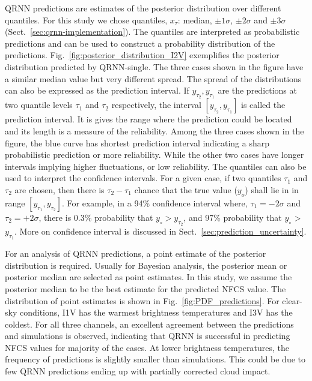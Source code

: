 \documentclass[amt, manuscript]{copernicus}
\begin{document}
QRNN predictions are estimates of the posterior distribution over different quantiles. For this study we chose quantiles, $x_{\tau}$: median, $\pm 1\sigma$, $\pm 2 \sigma$ and  $\pm 3 \sigma$ (Sect.~\ref{sec:qrnn-implementation}). The quantiles are interpreted as probabilistic predictions and can be used to construct a probability distribution of the predictions. Fig.~\ref{fig:posterior_distribution_I2V} exemplifies the posterior distribution predicted by QRNN-single. The three cases shown in the figure have a similar median value but very different spread. The spread of the distributions can also be expressed as the prediction interval. If $y_{\tau_2}, y_{\tau_1}$ are the predictions at two quantile levels $\tau_1$ and $\tau_2$ respectively, the interval $[y_{\tau_2}, y_{\tau_1}]$ is called the prediction interval. It is gives the range where the prediction could be located and its length is a measure of the reliability. Among the three cases shown in the figure, the blue curve has shortest prediction interval indicating a sharp probabilistic prediction or more reliability. While the other two cases have longer intervals implying higher fluctuations, or low reliability. The quantiles can also be used to interpret the confidence intervals. For a given case, if two quantiles $\tau_1$ and $\tau_2$ are chosen, then there is $\tau_2 - \tau_1$ chance that the true value ($y_o$) shall lie in in range $[y_{\tau_1}, y_{\tau_2}]$. For example, in a 94\% confidence interval where, $\tau_1 = -2\sigma$ and $\tau_2 = +2\sigma$, there is 0.3\% probability that $y_\circ > y_{\tau_2}$, and 97\% probability that $y_\circ$ > $y_{\tau_1}$. More on confidence interval is discussed in Sect.~\ref{sec:prediction_uncertainty}.

For an analysis of QRNN predictions, a point estimate of the posterior distribution is required. Usually for Bayesian analysis, the posterior mean or posterior median are selected as point estimates. In this study, we assume the posterior median to be the best estimate for the predicted NFCS value. The distribution of point estimates is shown in Fig.~\ref{fig:PDF_predictions}. For clear-sky conditions, I1V has the warmest brightness temperatures and I3V has the coldest. For all three channels, an excellent agreement between the predictions and simulations is observed, indicating that QRNN is successful in predicting NFCS values for majority of the cases. At lower brightness temperatures, the frequency of predictions is slightly smaller than simulations. This could be due to few QRNN predictions ending up with partially corrected cloud impact. 
 
\end{document}
